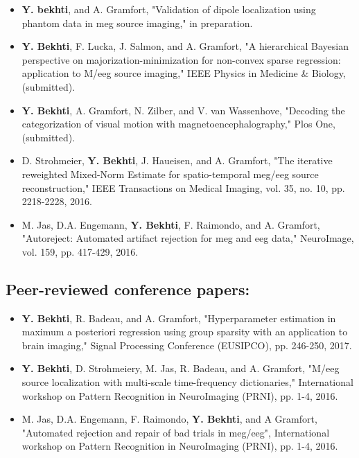 \begin{itemize}
\item \textbf{Y. bekhti}, and A. Gramfort, "Validation of dipole localization using phantom data in \ac{meg} source imaging," in preparation.
\item \textbf{Y. Bekhti}, F. Lucka, J. Salmon, and A. Gramfort, "A hierarchical Bayesian perspective on majorization-minimization for non-convex sparse regression: application to M/\ac{eeg} source imaging," IEEE Physics in Medicine \& Biology, (submitted).
\item \textbf{Y. Bekhti}, A. Gramfort, N. Zilber, and V. van Wassenhove, "Decoding the categorization of visual motion with magnetoencephalography," Plos One, (submitted).
\item D. Strohmeier, \textbf{Y. Bekhti}, J. Haueisen, and A. Gramfort, "The iterative reweighted Mixed-Norm Estimate for spatio-temporal \ac{meg}/\ac{eeg} source reconstruction," IEEE Transactions on Medical Imaging, vol. 35, no. 10, pp. 2218-2228, 2016.
\item M. Jas, D.A. Engemann, \textbf{Y. Bekhti}, F. Raimondo, and A. Gramfort, "Autoreject: Automated artifact rejection for \ac{meg} and \ac{eeg} data," NeuroImage, vol. 159, pp. 417-429, 2016.
\end{itemize}

\subsection*{Peer-reviewed conference papers:}
\begin{itemize}
\item \textbf{Y. Bekhti}, R. Badeau, and A. Gramfort, "Hyperparameter estimation in maximum a posteriori regression using group sparsity with an application to brain imaging," Signal Processing Conference (EUSIPCO), pp. 246-250, 2017.
\item \textbf{Y. Bekhti}, D. Strohmeiery, M. Jas, R. Badeau, and A. Gramfort, "M/\ac{eeg} source localization with multi-scale time-frequency dictionaries," International workshop on Pattern Recognition in NeuroImaging (PRNI), pp. 1-4, 2016.
\item M. Jas, D.A. Engemann, F. Raimondo, \textbf{Y. Bekhti}, and A Gramfort, "Automated rejection and repair of bad trials in \ac{meg}/\ac{eeg}", International workshop on Pattern Recognition in NeuroImaging (PRNI), pp. 1-4, 2016.
\end{itemize}
